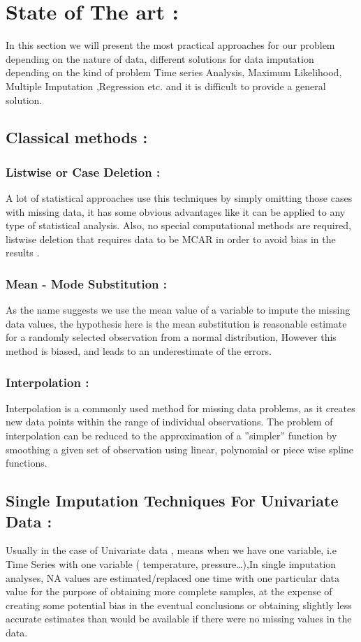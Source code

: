 \section{ State of The art :}
In this section we will present the most practical approaches for our problem depending on the nature of data, different solutions for data imputation depending on the kind of problem Time series Analysis, Maximum Likelihood, Multiple Imputation ,Regression etc. and it is difficult to provide a general solution.

\subsection{Classical methods :}

\subsubsection{Listwise or Case Deletion :} A lot of statistical approaches use this techniques by simply omitting those cases with missing data, it has some obvious advantages like it can be applied to any type of statistical analysis. Also, no special computational methods are required, listwise deletion that requires data to be MCAR in order to avoid bias in the results \cite{listwise}.

\subsubsection{Mean - Mode Substitution :}
 As the name suggests we use the mean value of a variable to impute the missing data values, the hypothesis here is the mean substitution is reasonable estimate for a randomly selected observation from a normal distribution, However this method is biased, and leads to an underestimate of the errors\cite{mean}. 

\subsubsection{Interpolation :}
Interpolation is a commonly used method for missing data problems, as it creates new data points within the range of individual observations. The problem of interpolation can be reduced to the approximation of a ”simpler” function by smoothing a given set of observation using linear, polynomial or piece wise spline functions. 


\subsection{Single Imputation Techniques For Univariate Data :}
Usually in the case of Univariate data , means when we have one variable, i.e Time Series  with one variable ( temperature, pressure…),In single imputation analyses, NA values are estimated/replaced one time with one particular data value for the purpose of obtaining more complete samples, at the expense of creating some potential bias in the eventual conclusions or obtaining slightly less accurate estimates than would be available if there were no missing values in the data.

